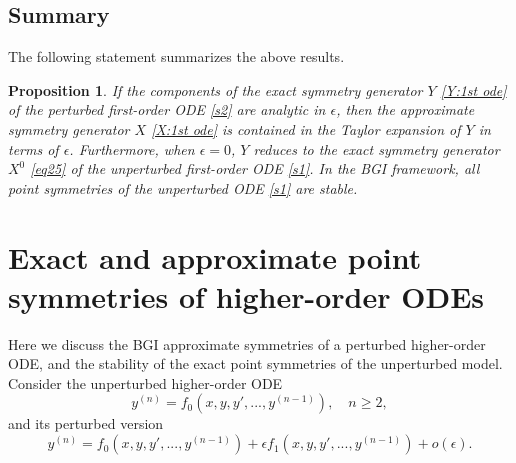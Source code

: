 \documentclass[11pt,letter,subeqn]{article}
\newtheorem{proposition}{Proposition}
\begin{document}
  \subsection{Summary}
  The following statement summarizes the above results.
  \begin{proposition}
    If the components of the exact symmetry generator $Y$ \eqref{Y:1st ode} of the perturbed first-order ODE \eqref{s2} are analytic in $\epsilon$, then the approximate symmetry generator $X$ \eqref{X:1st ode} is contained in the Taylor expansion of $Y$ in terms of $\epsilon$. Furthermore, when $\epsilon=0$, $Y$ reduces to the exact symmetry generator $X^0$ \eqref{eq25} of the unperturbed first-order ODE \eqref{s1}. In the BGI framework, all point symmetries of the unperturbed ODE \eqref{s1} are stable.
  \end{proposition}


\section{Exact and approximate point symmetries of higher-order ODEs}\label{sec:higherODEs}
Here we discuss the BGI approximate symmetries of a perturbed higher-order ODE, and the stability of the exact point symmetries of the unperturbed model. Consider the unperturbed higher-order ODE
  \begin{equation}\label{s06}
    y^{(n)}=f_0(x,y,y',...,y^{(n-1)}),\quad n\geq 2,
  \end{equation}
  and its perturbed version
   \begin{equation}\label{s6}
    y^{(n)}=f_0(x,y,y',...,y^{(n-1)})+\epsilon f_1(x,y,y',...,y^{(n-1)})+o(\epsilon).
  \end{equation}
\end{document}
